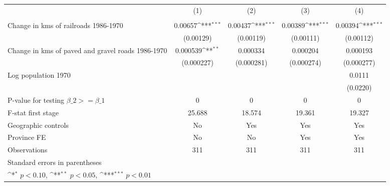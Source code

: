 {
\def\sym#1{\ifmmode^{#1}\else\(^{#1}\)\fi}
\begin{tabular}{l*{4}{c}}
\hline\hline
                &\multicolumn{1}{c}{(1)}&\multicolumn{1}{c}{(2)}&\multicolumn{1}{c}{(3)}&\multicolumn{1}{c}{(4)}\\
                &\multicolumn{1}{c}{}&\multicolumn{1}{c}{}&\multicolumn{1}{c}{}&\multicolumn{1}{c}{}\\
\hline
Change in kms of railroads 1986-1970&  0.00657\sym{***}&  0.00437\sym{***}&  0.00389\sym{***}&  0.00394\sym{***}\\
                &(0.00129)         &(0.00119)         &(0.00111)         &(0.00112)         \\
[1em]
Change in kms of paved and gravel roads 1986-1970& 0.000539\sym{**} & 0.000334         & 0.000204         & 0.000193         \\
                &(0.000227)         &(0.000281)         &(0.000274)         &(0.000277)         \\
[1em]
Log population 1970&                  &                  &                  &   0.0111         \\
                &                  &                  &                  & (0.0220)         \\
\hline
P-value for testing $\beta\_{2} >= \beta\_{1}$&        0         &        0         &        0         &        0         \\
F-stat first stage&   25.688         &   18.574         &   19.361         &   19.327         \\
Geographic controls&       No         &      Yes         &      Yes         &      Yes         \\
Province FE     &       No         &       No         &      Yes         &      Yes         \\
Observations    &      311         &      311         &      311         &      311         \\
\hline\hline
\multicolumn{5}{l}{\footnotesize Standard errors in parentheses}\\
\multicolumn{5}{l}{\footnotesize \sym{*} \(p<0.10\), \sym{**} \(p<0.05\), \sym{***} \(p<0.01\)}\\
\end{tabular}
}
